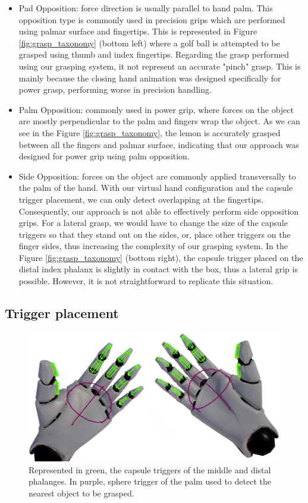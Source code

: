 \begin{itemize}
	\item Pad Opposition: force direction is usually parallel to hand palm. This opposition type is commonly used in precision grips which are performed using palmar surface and fingertips. This is represented in Figure \ref{fig:grasp_taxonomy} (bottom left) where a golf ball is attempted to be grasped using thumb and index fingertips. Regarding the grasp performed using our grasping system, it not represent an accurate "pinch" grasp. This is mainly because the closing hand animation was designed specifically for power grasp, performing worse in precision handling.
	\item Palm Opposition: commonly used in power grip, where forces on the object are mostly perpendicular to the palm and fingers wrap the object. As we can see in the Figure \ref{fig:grasp_taxonomy}, the lemon is accurately grasped between all the fingers and palmar surface, indicating that our approach was designed for power grip using palm opposition.
	\item Side Opposition: forces on the object are commonly applied transversally to the palm of the hand. With our virtual hand configuration and the capsule trigger placement, we can only detect overlapping at the fingertips. Consequently, our approach is not able to effectively perform side opposition grips. For a lateral grasp, we would have to change the size of the capsule triggers so that they stand out on the sides, or, place other triggers on the finger sides, thus increasing the complexity of our grasping system. In the Figure \ref{fig:grasp_taxonomy} (bottom right), the capsule trigger placed on the distal index phalanx is slightly in contact with the box, thus a lateral grip is possible. However, it is not straightforward to replicate this situation.	
\end{itemize}



\subsection{Trigger placement}

\begin{figure}[!t]
	\centering
	\includegraphics[width=.8\linewidth]{figures/unrealgrasp/mannequin_hands.jpg}
	\caption{Represented in green, the capsule triggers of the middle and distal phalanges. In purple, sphere trigger of the palm used to detect the nearest object to be grasped.}
	\label{fig:mannequinhands}
\end{figure}

